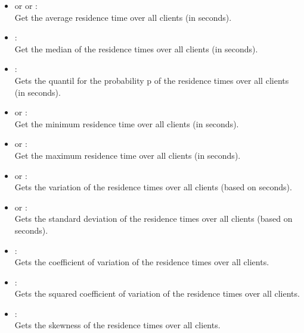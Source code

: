 \begin{itemize}

\item
{} or  or :\\
Get the average residence time over all clients (in seconds).

\item
{}:\\
Get the median of the residence times over all clients (in seconds).

\item
{}:\\
Gets the quantil for the probability p of the residence times over all clients (in seconds).

\item
{} or :\\
Get the minimum residence time over all clients (in seconds).

\item
{} or :\\
Get the maximum residence time over all clients (in seconds).

\item
{} or :\\
Gets the variation of the residence times over all clients (based on seconds).

\item
{} or :\\
Gets the standard deviation of the residence times over all clients (based on seconds).

\item
{}:\\
Gets the coefficient of variation of the residence times over all clients. 

\item
{}:\\
Gets the squared coefficient of variation of the residence times over all clients.

\item
{}:\\
Gets the skewness of the residence times over all clients.


\end{itemize}
